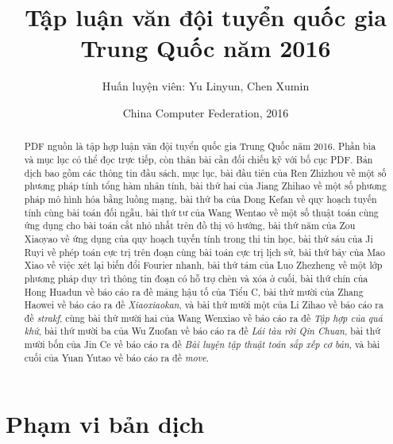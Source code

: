 \documentclass[11pt]{article}
\title{Tập luận văn đội tuyển quốc gia Trung Quốc năm 2016}
\author{Huấn luyện viên: Yu Linyun, Chen Xumin}
\date{China Computer Federation, 2016}
\begin{document}
\maketitle


\renewcommand{\abstractname}{Tóm tắt}
\begin{abstract}
PDF nguồn là tập hợp luận văn đội tuyển quốc gia Trung Quốc năm 2016. Phần
bìa và mục lục có thể đọc trực tiếp, còn thân bài cần đối chiếu kỹ với bố cục
PDF. Bản dịch bao gồm các thông tin đầu sách, mục lục, bài đầu tiên của Ren
Zhizhou về một số
phương pháp tính tổng hàm nhân tính, bài thứ hai của Jiang Zhihao về một số
phương pháp mô hình hóa bằng luồng mạng, bài thứ ba của Dong Kefan về quy
hoạch tuyến tính cùng bài toán đối ngẫu, bài thứ tư của Wang Wentao về một số
thuật toán cùng ứng dụng cho bài toán cắt nhỏ nhất trên đồ thị vô hướng, bài
thứ năm của Zou Xiaoyao về ứng dụng của quy hoạch tuyến tính trong thi tin
học, bài thứ sáu của Ji Ruyi về phép toán cực trị trên đoạn cùng bài toán cực
trị lịch sử, bài thứ bảy của Mao Xiao về việc xét lại biến đổi Fourier nhanh,
bài thứ tám của Luo Zhezheng về một lớp phương pháp duy trì thông tin đoạn có
hỗ trợ chèn và xóa ở cuối, bài thứ chín của Hong Huadun về báo cáo ra đề mảng
hậu tố của Tiểu C, bài thứ mười của Zhang Haowei về báo cáo ra đề
\emph{Xiaoxiaokan}, và bài thứ mười một của Li Zihao về báo cáo ra đề
\emph{strakf}, cùng bài thứ mười hai của Wang Wenxiao về báo cáo ra đề
\emph{Tập hợp của quá khứ}, bài thứ mười ba của Wu Zuofan về báo cáo ra đề
\emph{Lái tàu rời Qin Chuan}, bài thứ mười bốn của Jin Ce về báo cáo ra đề
\emph{Bài luyện tập thuật toán sắp xếp cơ bản}, và bài cuối của Yuan Yutao về
báo cáo ra đề \emph{move}.
\end{abstract}

\section{Phạm vi bản dịch}
\end{document}
